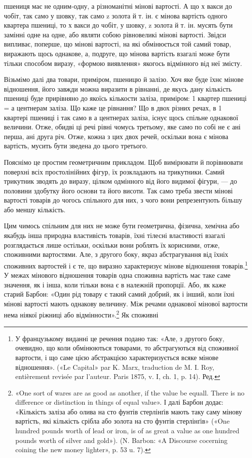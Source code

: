 пшениця має не одним-одну, а різноманітні мінові вартості.
А що х вакси до чобіт, так само у шовку, так само z золота й т. ін.
є мінова вартість одного квартера пшениці, то х вакси до чобіт,
у шовку, z золота й т. ін. мусять бути замінні одне на одне, або
являти собою рівновеликі мінові вартості. Звідси випливає, поперше,
що мінові вартості, на які обмінюється той самий товар,
виражають щось однакове, а, подруге, що мінова вартість взагалі
може бути тільки способом виразу, «формою виявлення» якогось
відмінного від неї змісту.

Візьмімо далі два товари, приміром, пшеницю й залізо. Хоч
яке буде їхнє мінове відношення, його завжди можна виразити
в рівнанні, де якусь дану кількість пшениці буде прирівняно до
якоїсь кількости заліза, приміром: 1 квартер пшениці = а центнерам
заліза. Що каже це рівнання? Що в двох різних речах,
в 1 квартері пшениці і так само в а центнерах заліза, існує щось
спільне однакової величини. Отже, обидві ці речі рівні чомусь
третьому, яке само по собі не є ані перша, ані друга річ. Отже,
кожна з цих двох речей, оскільки вона є мінова вартість, мусить
бути зведена до цього третього.

Пояснімо це простим геометричним прикладом. Щоб вимірювати
й порівнювати поверхні всіх простолінійних фігур, їх розкладають
на трикутники. Самий трикутник зводять до виразу,
цілком одмінного від його видимої фігури, — до половини здобутку
його основи та його висоти. Так само треба звести мінові
вартості товарів до чогось спільного для них, з чого вони репрезентують
більшу або меншу кількість.

Цим чимось спільним для них не може бути геометрична, фізична,
хемічна або якабудь інша природна властивість товарів,
їхні тілесні властивості взагалі розглядається лише остільки,
оскільки вони роблять їх корисними, отже, споживними вартостями.
Але, з другого боку, якраз абстрагування від їхніх споживних
вартостей і є те, що виразно характеризує мінове відношення
товарів.\footnote*{
У французькому виданні це речення подано так: «Але, з другого
боку, очевидно, що коли обмінюються товарами, то абстрагуються від
споживної вартости, і що саме цією абстракцією характеризується всяке
мінове відношення». («Le Capital» par K. Marx, traduction de M. I. Roy,
entièrement revisée par l’auteur. Paris 1875, v. I, ch. 1, p. 14). Ред.
} У межах мінового відношення товарів одна споживна
вартість має таке саме значення, як і інша, коли тільки
вона є в належній пропорції. Або, як каже старий Барбон: «Один
рід товару є такий самий добрий, як і інший, коли їхні мінові
вартості мають однакову величину. Між речами однакової мінової
вартости нема ніякої ріжниці або відмінности».\footnote{
«One sort of wares are as good as another, if the value be equall.
There is no difference or distinction in things of equal value». І далі Барбон
додає: «Кількість заліза або олива на сто фунтів стерлінґів мають таку
саму мінову вартість, які кількість срібла або золота на сто фунтів стерлінґів»
(«One hundred pounds worth of lead or iron, is of as great a value
as one hundred pounds worth of silver and gold»). (N. Barbon: «A Discourse
cocerning coining the new money lighter», p. 53 u. 7).
} Як споживні